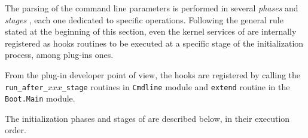 The parsing of the command line parameters is performed in several
\emph{phases} and \emph{stages}
,
each one dedicated to specific operations.
Following the general rule stated at the beginning of this section, even
the kernel services of \framac are internally registered as hooks routines to
be executed at a specific stage of the initialization process, among plug-ins
ones.

From the plug-in developer point of view, the hooks are registered by
calling the \texttt{run\_after\_$xxx$\_stage} routines in
\texttt{Cmdline} module and \texttt{extend} routine
in the \texttt{Boot.Main} module.

The initialization phases and stages of \framac are described below, in
their execution order.

